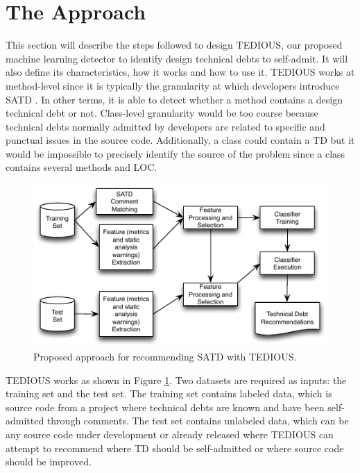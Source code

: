 \label{sec:Theme1}


\section{The Approach}


This section will describe the steps followed to design \ac{TEDIOUS}, our proposed machine learning detector to identify design technical debts to self-admit. It will also define its characteristics, how it works and how to use it. \ac{TEDIOUS} works at method-level since it is typically the granularity at which developers introduce \ac{SATD} \citep{MaldonadoS15,PotdarS14}. In other terms, it is able to detect whether a method contains a design technical debt or not. Class-level granularity would be too coarse because technical debts normally admitted by developers are related to specific and punctual issues in the source code. Additionally, a class could contain a \ac{TD} but it would be impossible to precisely identify the source of the problem since a class contains several methods and \ac{LOC}. \par 

\begin{figure}[t]
	\centering
	\includegraphics[width=\linewidth]{figs/approach.pdf}
	\caption{Proposed approach for recommending SATD with TEDIOUS.}
	\label{fig:approach}
	\vspace{-4mm}
\end{figure}

\ac{TEDIOUS} works as shown in Figure \ref{fig:approach}. Two datasets are required as inputs: the training set and the test set. The training set contains labeled data, which is source code from a project where technical debts are known and have been self-admitted through comments. The test set contains unlabeled data, which can be any source code under development or already released where \ac{TEDIOUS} can attempt to recommend where \ac{TD} should be self-admitted or where source code should be improved. \par 
	
